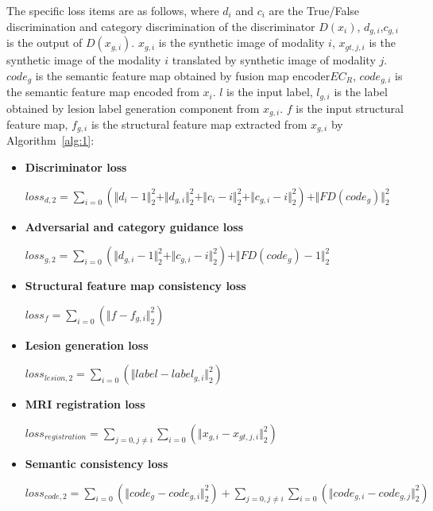 \documentclass[letterpaper]{article} %
\begin{document}
The specific loss items are as follows, where $d_{i}$ and $c_{i}$ are the True/False discrimination and category discrimination of the discriminator $D(x_i)$, $d_{g, i}$,$c_{g,i}$ is the output of $D(x_{g,i})$. $x_{g,i}$ is the synthetic image of modality $i$, $x_{gt,j,i}$ is the synthetic image of the modality $i$ translated by synthetic image of modality $j$. $code_g$ is the semantic feature map obtained by fusion map encoder$EC_R$, $code_{g,i}$ is the semantic feature map encoded from $x_i$. $l$ is the input label, $l_{g,i}$ is the label obtained by lesion label generation component from $x_{g,i}$. $f$ is the input structural feature map, $f_{g,i}$ is the structural feature map extracted from $x_{g,i}$ by Algorithm~\ref{alg:1}:
\begin{itemize}
	\item \textbf{Discriminator loss }
	\begin{center}
		$loss_{d,2}=\sum\limits_{i=0}(\Vert{d_{i}-1}\Vert_{2}^{2}+\Vert{d_{g,i}}\Vert_{2}^{2}+\Vert{c_{i}-i}\Vert_{2}^{2}+\Vert{c_{g,i}-i}\Vert_{2}^{2})+\Vert{FD(code_{g})}\Vert_{2}^{2}$
	\end{center}

	\item \textbf{Adversarial and category guidance loss}
	\begin{center}
		$loss_{g,2}=\sum\limits_{i=0}(\Vert{d_{g,i}-1}\Vert_{2}^{2}+\Vert{c_{g,i}-i}\Vert_{2}^{2})+\Vert{FD(code_{g})-1}\Vert_{2}^{2}$
	\end{center}
	
	\item \textbf{Structural feature map consistency loss}
	\begin{center}
		$loss_{f}=\sum\limits_{i=0}(\Vert{f-f_{g,i}}\Vert_{2}^{2})$
	\end{center}
	
	\item \textbf{Lesion generation loss}
	\begin{center}
		$loss_{lesion,2}=\sum\limits_{i=0}(\Vert{label-label_{g,i}}\Vert_{2}^{2})$
	\end{center}
	
	\item \textbf{MRI registration loss}
	\begin{center}
		$loss_{registration}=\sum\limits_{j=0,j\neq i}\sum\limits_{i=0}(\Vert{x_{g,i}-x_{gt,j,i}}\Vert_{2}^{2})$
	\end{center}
	
	\item \textbf{Semantic consistency loss}
	\begin{center}
		$loss_{code,2}=\sum\limits_{i=0}(\Vert{code_g-code_{g,i}}\Vert_{2}^{2})+\sum\limits_{j=0,j\neq i}\sum\limits_{i=0}(\Vert{code_{g,i}-code_{g,j}}\Vert_{2}^{2})$
	\end{center}
	
\end{itemize}
\end{document}
